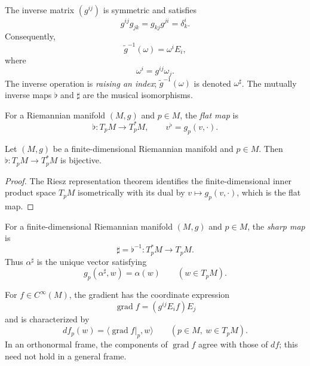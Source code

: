 The inverse matrix $(g^{ij})$ is symmetric and satisfies
\[
g^{ij}g_{jk}=g_{kj}g^{ji}=\delta_k^i.
\]
Consequently,
\[
\widetilde g^{-1}(\omega)=\omega^iE_i,
\]
where
\begin{equation}
\omega^i=g^{ij}\omega_j. \tag{2.13}
\end{equation}
The inverse operation is \emph{raising an index}; $\widetilde g^{-1}(\omega)$ is denoted
$\omega^\sharp$. The mutually inverse maps $\flat$ and $\sharp$ are the musical
isomorphisms.

\begin{definition}
\label{def:flat-map}
\leanok
{}
For a Riemannian manifold $(M,g)$ and $p\in M$, the \emph{flat map} is
\[
\flat\colon T_pM\longrightarrow T_p^*M,
\qquad v^\flat=g_p(v,\cdot).
\]
\end{definition}

\begin{lemma}
\label{lem:flat-bijective}
\leanok
{}
Let $(M,g)$ be a finite-dimensional Riemannian manifold and $p\in M$. Then
$\flat\colon T_pM\to T_p^*M$ is bijective.
\end{lemma}

\begin{proof}
\leanok
{}
\sketch The Riesz representation theorem identifies the finite-dimensional inner product space
$T_pM$ isometrically with its dual by $v\mapsto g_p(v,\cdot)$, which is the flat map.
\end{proof}

\begin{definition}
\label{def:sharp-map}
\leanok
{}
For a finite-dimensional Riemannian manifold $(M,g)$ and $p\in M$, the
\emph{sharp map} is
\[
\sharp=\flat^{-1}\colon T_p^*M\longrightarrow T_pM.
\]
Thus $\alpha^\sharp$ is the unique vector satisfying
\[
g_p(\alpha^\sharp,w)=\alpha(w)
\qquad (w\in T_pM).
\]
\end{definition}

For $f\in C^\infty(M)$, the gradient has the coordinate expression
\[
\operatorname{grad}f=(g^{ij}E_if)E_j
\]
and is characterized by
\begin{equation}
df_p(w)=\langle\operatorname{grad}f|_p,w\rangle
\qquad (p\in M,\ w\in T_pM). \tag{2.14}
\end{equation}
In an orthonormal frame, the components of $\operatorname{grad}f$ agree with those
of $df$; this need not hold in a general frame.

